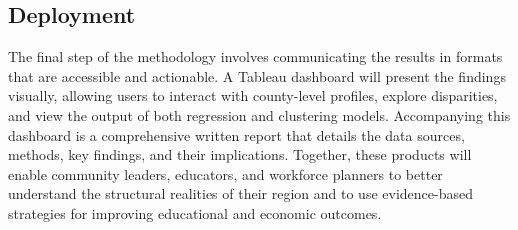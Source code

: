 \documentclass[12pt]{llncs}
\begin{document}
\subsection{Deployment}
The final step of the methodology involves communicating the results in formats that are accessible and actionable. A Tableau dashboard will present the findings visually, allowing users to interact with county-level profiles, explore disparities, and view the output of both regression and clustering models. Accompanying this dashboard is a comprehensive written report that details the data sources, methods, key findings, and their implications. Together, these products will enable community leaders, educators, and workforce planners to better understand the structural realities of their region and to use evidence-based strategies for improving educational and economic outcomes.
\end{document}
